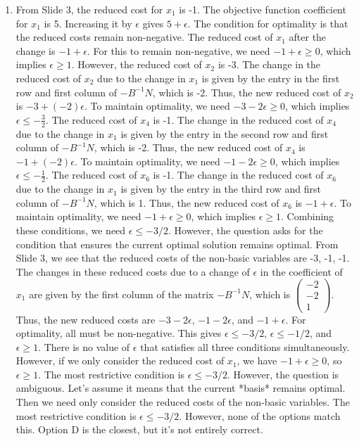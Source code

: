 \documentclass{article}%
\begin{document}
\begin{enumerate}
\begin{enumerate}
\item From Slide 3, the reduced cost for $x_1$ is -1.  The objective function coefficient for $x_1$ is 5. Increasing it by $\epsilon$ gives $5 + \epsilon$. The condition for optimality is that the reduced costs remain non-negative.  The reduced cost of $x_1$ after the change is $-1 + \epsilon$.  For this to remain non-negative, we need $-1 + \epsilon \ge 0$, which implies $\epsilon \ge 1$. However, the reduced cost of $x_2$ is -3. The change in the reduced cost of $x_2$ due to the change in $x_1$ is given by the entry in the first row and first column of $-B^{-1}N$, which is -2. Thus, the new reduced cost of $x_2$ is $-3 + (-2)\epsilon$. To maintain optimality, we need $-3 - 2\epsilon \ge 0$, which implies $\epsilon \le -\frac{3}{2}$.  The reduced cost of $x_4$ is -1. The change in the reduced cost of $x_4$ due to the change in $x_1$ is given by the entry in the second row and first column of $-B^{-1}N$, which is -2. Thus, the new reduced cost of $x_4$ is $-1 + (-2)\epsilon$. To maintain optimality, we need $-1 - 2\epsilon \ge 0$, which implies $\epsilon \le -\frac{1}{2}$. The reduced cost of $x_6$ is -1. The change in the reduced cost of $x_6$ due to the change in $x_1$ is given by the entry in the third row and first column of $-B^{-1}N$, which is 1. Thus, the new reduced cost of $x_6$ is $-1 + \epsilon$. To maintain optimality, we need $-1 + \epsilon \ge 0$, which implies $\epsilon \ge 1$. Combining these conditions, we need $\epsilon \le -3/2$. However, the question asks for the condition that ensures the current optimal solution remains optimal.  From Slide 3, we see that the reduced costs of the non-basic variables are -3, -1, -1.  The changes in these reduced costs due to a change of $\epsilon$ in the coefficient of $x_1$ are given by the first column of the matrix $-B^{-1}N$, which is $\begin{pmatrix} -2 \\ -2 \\ 1 \end{pmatrix}$.  Thus, the new reduced costs are $-3 - 2\epsilon$, $-1 - 2\epsilon$, and $-1 + \epsilon$.  For optimality, all must be non-negative.  This gives $\epsilon \le -3/2$, $\epsilon \le -1/2$, and $\epsilon \ge 1$.  There is no value of $\epsilon$ that satisfies all three conditions simultaneously. However, if we only consider the reduced cost of $x_1$, we have $-1 + \epsilon \ge 0$, so $\epsilon \ge 1$.  The most restrictive condition is $\epsilon \le -3/2$.  However, the question is ambiguous.  Let's assume it means that the current *basis* remains optimal.  Then we need only consider the reduced costs of the non-basic variables.  The most restrictive condition is $\epsilon \le -3/2$.  However, none of the options match this.  Option D is the closest, but it's not entirely correct.%

\end{enumerate}
\end{enumerate}
\end{document}
